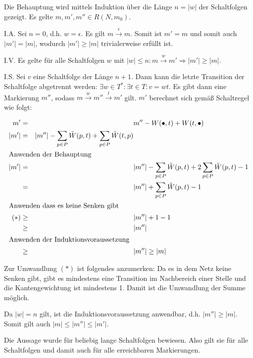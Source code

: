 \documentclass[10pt,a4paper,oneside,ngerman,numbers=noenddot]{scrartcl}
\begin{document}
		\subsubsection{}
		Die Behauptung wird mittels Induktion über die Länge \(n = |w|\) der Schaltfolgen gezeigt. Es gelte \(m, m', m'' \in R(N, m_{0})\).
		
		I.A. Sei \(n=0\), d.h. \(w = \epsilon\). Es gilt \(m \overset{\epsilon}{\rightarrow} m\). Somit ist \(m' = m\) und somit auch \(|m'| = |m|\), wodurch \(|m'| \geq |m|\) trivialerweise erfüllt ist.
		
		I.V. Es gelte für alle Schaltfolgen \(w\) mit \(|w| \leq n: m \overset{w}{\rightarrow} m' \Longrightarrow |m'| \geq |m|\).
		
		I.S. Sei \(v\) eine Schaltfolge der Länge \(n + 1\). Dann kann die letzte Transition der Schaltfolge abgetrennt werden: \(\exists w \in T^{*}: \exists t \in T: v = wt\). Es gibt dann eine Markierung \(m''\), sodass \(m \overset{w}{\rightarrow} m'' \overset{t}{\rightarrow} m'\) gilt. \(m'\) berechnet sich gemäß Schaltregel wie folgt:
		
		\begin{alignat*}{2}
			m' &=&& m'' - W(\bullet, t) + W(t, \bullet) \\
			|m'| &=& |m''| - \sum_{p \in P}\tilde{W}(p,t) + \sum_{p \in P}\tilde{W}(t,p) \\
			\intertext{Anwenden der Behauptung}
			|m'| &=&& |m''| - \sum_{p \in P}\tilde{W}(p,t) + 2\sum_{p \in P}\tilde{W}(p,t) - 1 \\
			&=&& |m''| + \sum_{p \in P}\tilde{W}(p,t) - 1 \\
			\intertext{Anwenden dass es keine Senken gibt}
			(*) &\geq && |m''| + 1 - 1 \\
			&\geq && |m''| \\
			\intertext{Anwenden der Induktionsvoraussetzung}
			&\geq && |m''| \geq |m|
		\end{alignat*}
		
		Zur Umwandlung \((*)\) ist folgendes anzumerken: Da es in dem Netz keine Senken gibt, gibt es mindestens eine Transition im Nachbereich einer Stelle und die Kantengewichtung ist mindestens 1. Damit ist die Umwandlung der Summe möglich.
		
		Da \(|w| = n\) gilt, ist die Induktionsvoraussetzung anwendbar, d.h. \(|m''| \geq |m|\). Somit gilt auch \(|m| \leq |m''| \leq |m'|\).
		
		Die Aussage wurde für beliebig lange Schaltfolgen bewiesen. Also gilt sie für alle Schaltfolgen und damit auch für alle erreichbaren Markierungen.
\end{document}
